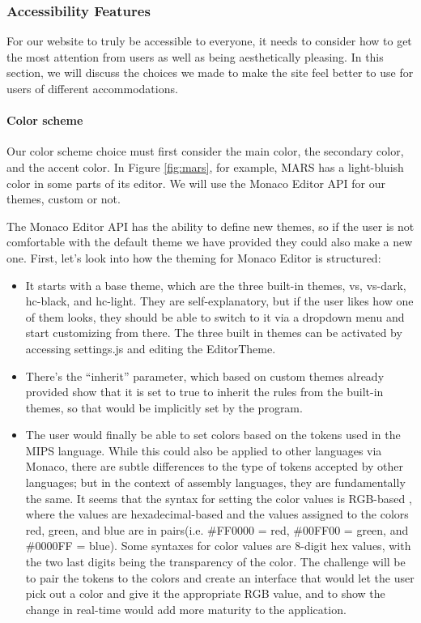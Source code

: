 \documentclass[parskip=half, fontsize=12pt]{scrartcl}
\providecommand{\tightlist}{%
  \setlength{\itemsep}{0pt}\setlength{\parskip}{0pt}}
\begin{document}
\subsubsection{Accessibility Features}
\label{subsec:accessibility-features}

For our website to truly be accessible to everyone, it needs to consider
how to get the most attention from users as well as being aesthetically
pleasing. In this section, we will discuss the choices we made to make
the site feel better to use for users of different accommodations.

\paragraph{Color scheme}

Our color scheme choice must first consider the main color, the
secondary color, and the accent color. In Figure \ref{fig:mars}, for example, MARS
has a light-bluish color in some parts of its editor. We will use the
Monaco Editor API for our themes, custom or not.

The Monaco Editor API has the ability to define new themes, so if the
user is not comfortable with the default theme we have provided they
could also make a new one. First, let's look into how the theming for
Monaco Editor is structured:

\begin{itemize}
    \tightlist
    \item It starts with a base theme, which are the three built-in themes, vs,
    vs-dark, hc-black, and hc-light. They are self-explanatory, but if the
    user likes how one of them looks, they should be able to switch to it
    via a dropdown menu and start customizing from there. The three built
    in themes can be activated by accessing settings.js and editing the
    EditorTheme.
    \item There's the ``inherit'' parameter, which based on custom themes
    already provided \cite{monaco-themes} show that it is set to true to inherit the rules
    from the built-in themes, so that would be implicitly set by the
    program.
    \item The user would finally be able to set colors based on the tokens used
    in the MIPS language. While this could also be applied to other
    languages via Monaco, there are subtle differences to the type of
    tokens accepted by other languages; but in the context of assembly
    languages, they are fundamentally the same. It seems that the syntax
    for setting the color values is RGB-based \cite{rapidtables-rgb}, where the values are
    hexadecimal-based and the values assigned to the colors red, green,
    and blue are in pairs(i.e. \#FF0000 = red, \#00FF00 = green, and
    \#0000FF = blue). Some syntaxes for color values are 8-digit hex
    values, with the two last digits being the transparency of the color.
    The challenge will be to pair the tokens to the colors and create an
    interface that would let the user pick out a color and give it the
    appropriate RGB value, and to show the change in real-time would add
    more maturity to the application.
\end{itemize}
\end{document}
